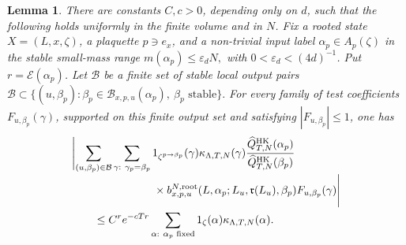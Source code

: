 \documentclass[11pt,a4paper,reqno]{amsart}
\newtheorem{lemma}[theorem]{Lemma}
\theoremstyle{definition}
\theoremstyle{remark}
\newcommand\HK{{\mathrm{HK}}}
\begin{document}
\begin{lemma}\label{lem:paid-local-adjoint-row}
There are constants $C,c>0$, depending only on $d$, such that the following holds uniformly in the finite volume and in $N$.  Fix a rooted state $X=(L,x,\zeta)$, a plaquette $p\ni e_x$, and a non-trivial input label $\alpha_p\in A_p(\zeta)$ in the stable small-mass range $m(\alpha_p)\le \varepsilon_d N,$ with $0<\varepsilon_d<(4d)^{-1}$.  Put $r=\mathcal E(\alpha_p)$. Let $\mathcal B$ be a finite set of stable local output pairs $\mathcal B\subset \{(u,\beta_p):\beta_p\in\mathcal B_{x,p,u}(\alpha_p),\ \beta_p\text{ stable}\}.$ For every family of test coefficients $F_{u,\beta_p}(\gamma)$, supported on this finite output set and satisfying $|F_{u,\beta_p}|\le1$, one has
\begin{align}\label{eq:paid-local-adjoint-row}
&\Biggl|
\sum_{(u,\beta_p)\in\mathcal B}
\sum_{\substack{\gamma:\ \gamma_p=\beta_p}}
1_{\zeta^{p\to\beta_p}}(\gamma)
\kappa_{\Lambda,T,N}(\gamma)
\frac{\widehat Q^\HK_{T,N}(\alpha_p)}
{\widehat Q^\HK_{T,N}(\beta_p)}
\notag\\[-1mm]
&\hspace{2.6cm}\times
b^{N,\mathrm{root}}_{x,p,u}
(L,\alpha_p;L_u,\mathfrak r(L_u),\beta_p)
F_{u,\beta_p}(\gamma)
\Biggr|
\notag\\
&\qquad\le
C^r e^{-cTr}
\sum_{\substack{\alpha:\ \alpha_p\text{ fixed}}}
1_\zeta(\alpha)\kappa_{\Lambda,T,N}(\alpha).
\end{align}
\end{lemma}
\end{document}
